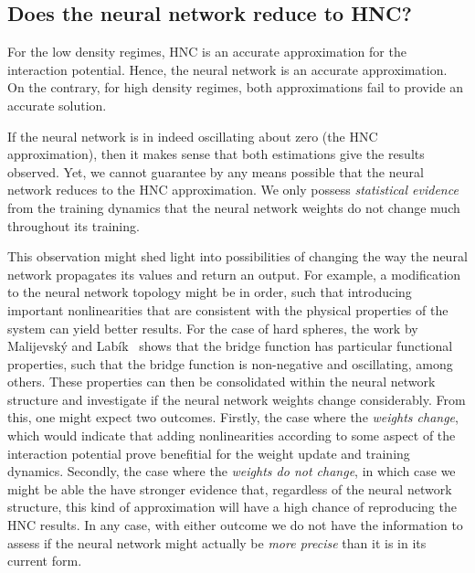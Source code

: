 \subsection{Does the neural network reduce to HNC?}
For the low density regimes, HNC is an accurate approximation for the interaction potential.
Hence, the neural network is an accurate approximation. On the contrary, for high density
regimes, both approximations fail to provide an accurate solution.

If the neural network is in indeed oscillating about zero (the HNC approximation), then
it makes sense that both estimations give the results observed. Yet, we cannot guarantee
by any means possible that the neural network reduces to the HNC approximation.
We only possess \emph{statistical evidence} from the training dynamics that the neural
network weights do not change much throughout its training.

This observation might shed light into possibilities of changing the way the neural
network propagates its values and return an output. For example, a modification to the
neural network topology might be in order, such that introducing important 
nonlinearities that are consistent with the physical properties of the system can yield
better results. For the case of hard spheres, the work by Malijevský and Labík~\cite{malijevskyBridgeFunctionHard1987}
shows that the bridge function has particular functional properties, such that the
bridge function is non-negative and oscillating, among others. These properties can then
be consolidated within the neural network structure and investigate if the neural network 
weights change considerably.
From this, one might expect two outcomes. Firstly, the case where the \emph{weights change},
which would indicate that adding nonlinearities according to some aspect of the interaction 
potential prove benefitial for the weight update and training dynamics.
Secondly, the case where the \emph{weights do not change}, in which case we might
be able the have stronger evidence that, regardless of the neural network structure,
this kind of approximation will have a high chance of reproducing the HNC results.
In any case, with either outcome we do not have the information to assess if the neural
network might actually be \emph{more precise} than it is in its current form.


